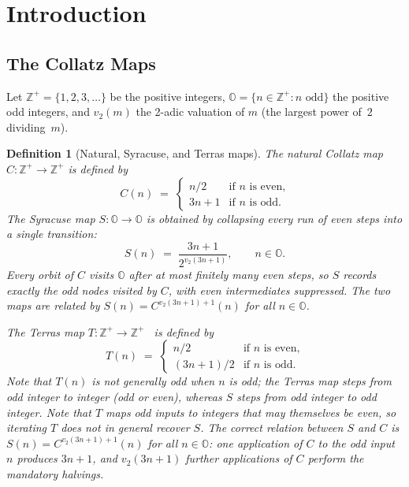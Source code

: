 \documentclass[11pt,a4paper]{article}
\newtheorem{definition}[theorem]{Definition}
\theoremstyle{remark}
\theoremstyle{plain}
\begin{document}
\section{Introduction}


\subsection{The Collatz Maps}

Let $\mathbb{Z}^+ = \{1, 2, 3, \ldots\}$ be the positive integers,
$\mathbb{O} = \{n \in \mathbb{Z}^+ : n \text{ odd}\}$ the positive odd integers, and
$v_2(m)$ the 2-adic valuation of $m$ (the largest power of~$2$ dividing~$m$).

\begin{definition}[Natural, Syracuse, and Terras maps]\label{def:maps}
The \emph{natural Collatz map} $C : \mathbb{Z}^+ \to \mathbb{Z}^+$ is defined by
\[
  C(n) \;=\; \begin{cases} n/2 & \text{if } n \text{ is even,} \\ 3n+1 & \text{if } n \text{ is odd.} \end{cases}
\]
The \emph{Syracuse map} $S : \mathbb{O} \to \mathbb{O}$ is obtained by collapsing
every run of even steps into a single transition:
\[
  S(n) \;=\; \frac{3n+1}{2^{v_2(3n+1)}}, \qquad n \in \mathbb{O}.
\]
Every orbit of $C$ visits $\mathbb{O}$ after at most finitely many even steps, so $S$
records exactly the odd nodes visited by $C$, with even intermediates suppressed.
The two maps are related by $S(n) = C^{v_2(3n+1)+1}(n)$ for all $n \in \mathbb{O}$.

The \emph{Terras map} $T : \mathbb{Z}^+ \to \mathbb{Z}^+$~\cite{terras1976} is defined by
\[
  T(n) \;=\; \begin{cases} n/2 & \text{if } n \text{ is even,} \\ (3n+1)/2 & \text{if } n \text{ is odd.} \end{cases}
\]
Note that $T(n)$ is not generally odd when $n$ is odd; the Terras map steps from odd integer to
integer (odd or even), whereas $S$ steps from odd integer to odd integer.
Note that $T$ maps odd inputs to integers that may themselves be even, so iterating
$T$ does not in general recover $S$.
The correct relation between $S$ and $C$ is $S(n) = C^{v_2(3n+1)+1}(n)$ for all
$n \in \mathbb{O}$: one application of $C$ to the odd input $n$ produces $3n+1$,
and $v_2(3n+1)$ further applications of $C$ perform the mandatory halvings.
\end{definition}
\end{document}
